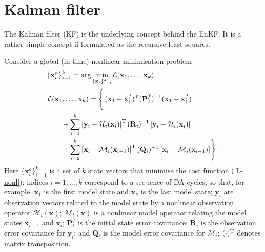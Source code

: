 \documentclass[11pt]{report}
\newcommand{\mb} {\mathbf}
\newcommand{\T}{^{\tiny \mathrm T}}
\begin{document}
\section{Kalman filter}

The Kalman filter (KF) is the underlying concept behind the EnKF.
It is a rather simple concept if formulated as the recursive least squares.

Consider a global (in time) nonlinear minimisation problem
\begin{align}
  \label{min-nonl}
  &\{\mb x_i^a\}_{i=1}^k = \arg \underset{\{\mb x_i\}_{i = 1}^k}\min \mathcal L(\mb x_1, \dots, \mb x_k),\\
  \nonumber
  &\mathcal L(\mb x_1, \dots, \mb x_k)  = \left \{ \left . (\mb x_1 - \mb x_1^f)\T (\mb P_1^f)^{-1} (\mb x_1 - \mb x_1^f) 
  \vphantom{\sum_{i = 2}^{k}}
  \right . \right . \\
  \nonumber
  & \qquad \left . + \sum_{i = 1}^k \left [ \mb y_i - \mathcal H_i(\mb x_i) \right ] \T (\mb R_i)^{-1} \left [ \mb y_i - \mathcal H_i(\mb x_i) \right ] \right .\\ 
  & \qquad \left . + \sum_{i = 2}^{k} \left [ \mb x_i - \mathcal M_i(\mb x_{i-1}) \right ]\T (\mb Q_i)^{-1} \left [ \mb x_i - \mathcal M_i(\mb x_{i-1}) \right ]  \right \}.
  \label{L-nonl}
\end{align}
Here $\{\mb x_i^a\}_{i=1}^k$ is a set of $k$ state vectors that minimise the cost function (\ref{L-nonl}); indices $i = 1,\dots,k$ correspond to a sequence of DA cycles, so that, for example, $\mb x_1$ is the first model state and $\mb x_k$ is the last model state; $\mb y_i$ are observation vectors related to the model state by a nonlinear observation operator $\mathcal H_i(\mb x)$; $\mathcal M_i(\mb x)$ is a nonlinear model operator relating the model states $\mb x_{i - 1}$ and $\mb x_i$; $\mb P_1^f$ is the initial state error covariance; $\mb R_i$ is the observation error covariance for $\mb y_i$; and $\mb Q_i$ is the model error covariance for $\mathcal M_i$; $(\cdot)\T$ denotes matrix transposition.
\end{document}
